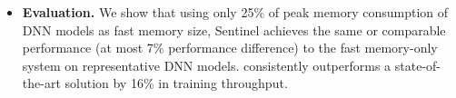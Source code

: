 \begin{itemize}[leftmargin=*]

\item \textbf{Evaluation.} %
We show that using only \textcolor{check}{25\%} of peak memory consumption of DNN models as fast memory size, Sentinel achieves the same or comparable performance (at most \textcolor{check}{7\%} performance difference) to  the fast memory-only system on representative DNN models. \name consistently outperforms a state-of-the-art solution by \textcolor{check}{16\%} \textcolor{dong2}{in training throughput}.

 
\end{itemize}





\begin{comment}
CPU for machine learning. 

We focus on CPU as the training platform because of following reasons:
(1) The widespread deployment of CPUs makes this hardware platform an attractive target for machine learning model training. 
(2) The optimizations on GPU lack of generality. 
(3) In terms of programmability, porting the original
code to GPU kernels requires significant programming efforts; 
(4) GPU has strong bias towards certain application.
Existing effort has been made in academic and industry to optimize machine learning training on widely available CPU based architecture. Adam~\cite{Chilimbi:2014:PAB:2685048.2685094} from Microsoft. Intel MKL-DNN\cite{intelMKL} has been proposed to accelerate machine learning training. 

\end{comment}